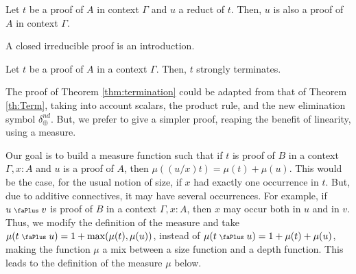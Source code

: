 \documentclass[screen, sigconf,authorversion,nonacm]{acmart}
\theoremstyle{acmdefinition}
\numberwithin{equation}{section}
\newcommand\plus{\mathrel{\text{\normalfont\scalebox{0.7}{\faPlus}}}}
\newcommand\elimplus{\delta_{\oplus}}
\begin{document}
\begin{theorem}\label{thm:SRlin}
Let $t$ be a proof of $A$ in context $\Gamma$ and $u$ a reduct of 
$t$. Then, $u$ is also a proof of $A$ in context $\Gamma$.
\end{theorem}

\begin{theorem}[Introduction]
  \label{introductionslinear}
A closed irreducible proof is an introduction.
\end{theorem}

\begin{theorem}[Termination]  
\label{thm:termination}
Let $t$ be a proof of $A$ in a context $\Gamma$. Then, $t$ strongly terminates.
\end{theorem}

The proof of Theorem \ref{thm:termination} could be adapted from that
of Theorem \ref{th:Term}, taking into account scalars, the product
rule, and the new elimination symbol $\elimplus^{nd}$.  But, we prefer
to give a simpler proof, reaping the benefit of linearity, using a
measure.

Our goal is to build a measure function such that if $t$ is proof of
$B$ in a context $\Gamma, x:A$ and $u$ is a proof of $A$, then
$\mu((u/x)t) = \mu(t) + \mu(u)$. This would be the case, for the usual
notion of size, if $x$ had exactly one occurrence in $t$. But, due to
additive connectives, it may have several occurrences.  For example,
if $u \plus v$ is proof of $B$ in a context $\Gamma, x:A$, then $x$
may occur both in $u$ and in $v$.  Thus, we modify the definition of
the measure and take $\mu(t \plus u) = 1 + \max(\mu(t), \mu(u))$,
instead of $\mu(t \plus u) = 1 + \mu(t) + \mu(u)$, making the function
$\mu$ a mix between a size function and a depth function.  This leads
to the definition of the measure $\mu$ below.
\end{document}
